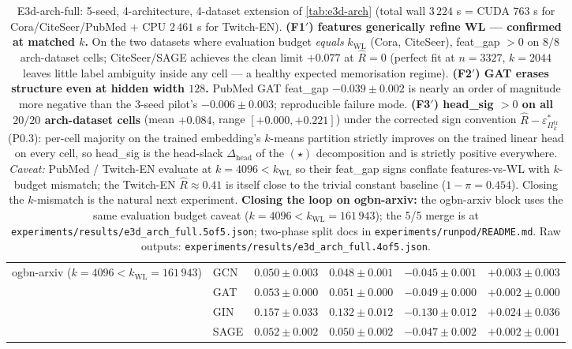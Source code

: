 \documentclass[10pt]{article}
\theoremstyle{definition}
\theoremstyle{remark}
\newcommand{\eps}{\varepsilon}
\begin{document}
\begin{table}[h]
\begin{tabular}{llrrrr}
\midrule
ogbn-arxiv ($k{=}4096{<}k_{\mathrm{WL}}{=}161\,943$)
 & GCN   & $0.050{\pm}0.003$ & $0.048{\pm}0.001$ & $\mathbf{-0.045{\pm}0.001}$ & $+0.003{\pm}0.003$ \\
 & GAT   & $0.053{\pm}0.000$ & $0.051{\pm}0.000$ & $\mathbf{-0.049{\pm}0.000}$ & $+0.002{\pm}0.000$ \\
 & GIN   & $0.157{\pm}0.033$ & $0.132{\pm}0.012$ & $\mathbf{-0.130{\pm}0.012}$ & $+0.024{\pm}0.036$ \\
 & SAGE  & $0.052{\pm}0.002$ & $0.050{\pm}0.002$ & $\mathbf{-0.047{\pm}0.002}$ & $+0.002{\pm}0.001$ \\
\bottomrule
\end{tabular}
\caption{E3d-arch-full: 5-seed, 4-architecture, 4-dataset
extension of \cref{tab:e3d-arch} (total wall $3\,224$ s = CUDA
$763$ s for Cora/CiteSeer/PubMed + CPU $2\,461$ s for
Twitch-EN). \textbf{(F1$'$) features generically refine WL ---
confirmed at matched $k$.} On the two datasets where evaluation
budget \emph{equals} $k_{\mathrm{WL}}$ (Cora, CiteSeer),
feat\_gap $> 0$ on $8/8$ arch-dataset cells; CiteSeer/SAGE
achieves the clean limit $+0.077$ at $\hat R = 0$ (perfect fit
at $n{=}3327$, $k{=}2044$ leaves little label ambiguity inside
any cell --- a healthy expected memorisation regime).
\textbf{(F2$'$) GAT erases structure even at hidden width
$128$.} PubMed GAT feat\_gap $-0.039 \pm 0.002$ is nearly an
order of magnitude more negative than the 3-seed pilot's
$-0.006 \pm 0.003$; reproducible failure mode.
\textbf{(F3$'$) head\_sig $> 0$ on all $20/20$ arch-dataset
cells} (mean $+0.084$, range $[+0.000, +0.221]$) under the
corrected sign convention $\hat R - \eps^{*}_{\Pi^{\mathrm{tr}}_{k}}$
(P0.3): per-cell majority on the trained embedding's
$k$-means partition strictly improves on the trained linear
head on every cell, so head\_sig is the head-slack
$\Delta_{\mathrm{head}}$ of the $(\star)$ decomposition and is
strictly positive everywhere. \emph{Caveat:}
PubMed / Twitch-EN evaluate at $k = 4096 < k_{\mathrm{WL}}$ so
their feat\_gap signs conflate features-vs-WL with $k$-budget
mismatch; the Twitch-EN $\hat R \approx 0.41$ is itself close
to the trivial constant baseline ($1 - \pi = 0.454$). Closing
the $k$-mismatch is the natural next experiment.
\textbf{Closing the loop on ogbn-arxiv:} the ogbn-arxiv block uses the same evaluation budget caveat ($k=4096<k_{\mathrm{WL}}=161\,943$); the 5/5 merge is at \texttt{experiments/results/e3d\_arch\_full.5of5.json}; two-phase split docs in \texttt{experiments/runpod/README.md}. Raw outputs:
\texttt{experiments/results/e3d\_arch\_full.4of5.json}.}
\label{tab:e3d-arch-full}
\end{table}
\end{document}
